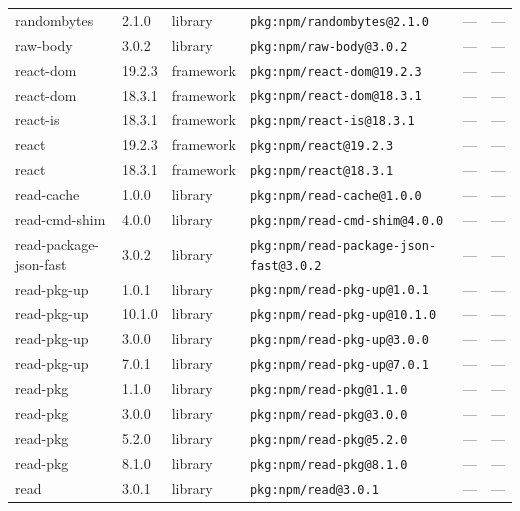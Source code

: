 \documentclass[11pt,a4paper]{article}
\begin{document}
\begin{longtable}{|p{4cm}|p{2cm}|p{1.6cm}|p{5cm}|p{1.5cm}|p{3.5cm}|}
\raggedright randombytes & 2.1.0 & library & \small\texttt{pkg:npm/randombytes@2.1.0} & — & \small — \\
\raggedright raw-body & 3.0.2 & library & \small\texttt{pkg:npm/raw-body@3.0.2} & — & \small — \\
\raggedright react-dom & 19.2.3 & framework & \small\texttt{pkg:npm/react-dom@19.2.3} & — & \small — \\
\raggedright react-dom & 18.3.1 & framework & \small\texttt{pkg:npm/react-dom@18.3.1} & — & \small — \\
\raggedright react-is & 18.3.1 & framework & \small\texttt{pkg:npm/react-is@18.3.1} & — & \small — \\
\raggedright react & 19.2.3 & framework & \small\texttt{pkg:npm/react@19.2.3} & — & \small — \\
\raggedright react & 18.3.1 & framework & \small\texttt{pkg:npm/react@18.3.1} & — & \small — \\
\raggedright read-cache & 1.0.0 & library & \small\texttt{pkg:npm/read-cache@1.0.0} & — & \small — \\
\raggedright read-cmd-shim & 4.0.0 & library & \small\texttt{pkg:npm/read-cmd-shim@4.0.0} & — & \small — \\
\raggedright read-package-json-fast & 3.0.2 & library & \small\texttt{pkg:npm/read-package-json-fast@3.0.2} & — & \small — \\
\raggedright read-pkg-up & 1.0.1 & library & \small\texttt{pkg:npm/read-pkg-up@1.0.1} & — & \small — \\
\raggedright read-pkg-up & 10.1.0 & library & \small\texttt{pkg:npm/read-pkg-up@10.1.0} & — & \small — \\
\raggedright read-pkg-up & 3.0.0 & library & \small\texttt{pkg:npm/read-pkg-up@3.0.0} & — & \small — \\
\raggedright read-pkg-up & 7.0.1 & library & \small\texttt{pkg:npm/read-pkg-up@7.0.1} & — & \small — \\
\raggedright read-pkg & 1.1.0 & library & \small\texttt{pkg:npm/read-pkg@1.1.0} & — & \small — \\
\raggedright read-pkg & 3.0.0 & library & \small\texttt{pkg:npm/read-pkg@3.0.0} & — & \small — \\
\raggedright read-pkg & 5.2.0 & library & \small\texttt{pkg:npm/read-pkg@5.2.0} & — & \small — \\
\raggedright read-pkg & 8.1.0 & library & \small\texttt{pkg:npm/read-pkg@8.1.0} & — & \small — \\
\raggedright read & 3.0.1 & library & \small\texttt{pkg:npm/read@3.0.1} & — & \small — \\

\end{longtable}
\end{document}
